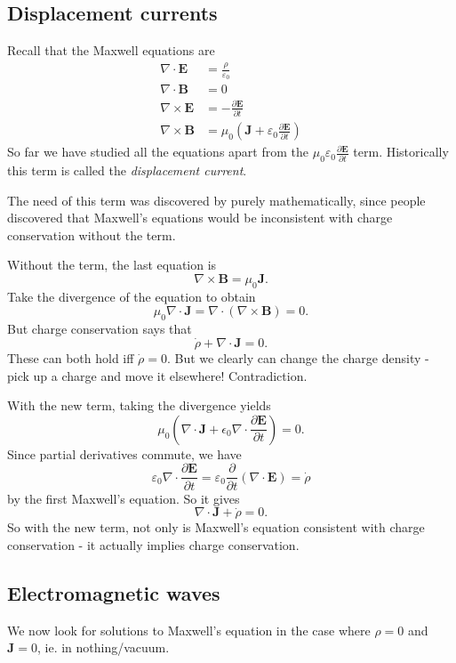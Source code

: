 \documentclass[a4paper]{article}
\begin{document}
\subsection{Displacement currents}
Recall that the Maxwell equations are
\begin{align*}
  \nabla \cdot \mathbf{E} &= \frac{\rho}{\varepsilon_0}\\
  \nabla \cdot \mathbf{B} &= 0\\
  \nabla \times \mathbf{E} &= -\frac{\partial \mathbf{E}}{\partial t}\\
  \nabla \times \mathbf{B} &= \mu_0\left(\mathbf{J} + \varepsilon_0 \frac{\partial \mathbf{E}}{\partial t}\right)
\end{align*}
So far we have studied all the equations apart from the $\mu_0\varepsilon_0 \frac{\partial \mathbf{E}}{\partial t}$ term. Historically this term is called the \emph{displacement current}.

The need of this term was discovered by purely mathematically, since people discovered that Maxwell's equations would be inconsistent with charge conservation without the term.

Without the term, the last equation is
\[
  \nabla \times \mathbf{B} = \mu_0 \mathbf{J}.
\]
Take the divergence of the equation to obtain
\[
  \mu_0 \nabla\cdot \mathbf{J} = \nabla\cdot (\nabla\times \mathbf{B}) = 0.
\]
But charge conservation says that
\[
  \dot{\rho} + \nabla\cdot \mathbf{J} = 0.
\]
These can both hold iff $\dot{\rho} = 0$. But we clearly can change the charge density - pick up a charge and move it elsewhere! Contradiction.


With the new term, taking the divergence yields
\[
  \mu_0\left(\nabla\cdot \mathbf{J} + \epsilon_0 \nabla\cdot \frac{\partial \mathbf{E}}{\partial t}\right) = 0.
\]
Since partial derivatives commute, we have
\[
  \varepsilon_0\nabla\cdot \frac{\partial \mathbf{E}}{\partial t} = \varepsilon_0 \frac{\partial}{\partial t} (\nabla\cdot \mathbf{E}) = \dot{\rho}
\]
by the first Maxwell's equation. So it gives
\[
  \nabla\cdot \mathbf{J} + \dot{\rho} = 0.
\]
So with the new term, not only is Maxwell's equation consistent with charge conservation - it actually implies charge conservation.

\subsection{Electromagnetic waves}
We now look for solutions to Maxwell's equation in the case where $\rho = 0$ and $\mathbf{J} = 0$, ie. in nothing/vacuum.
\end{document}
